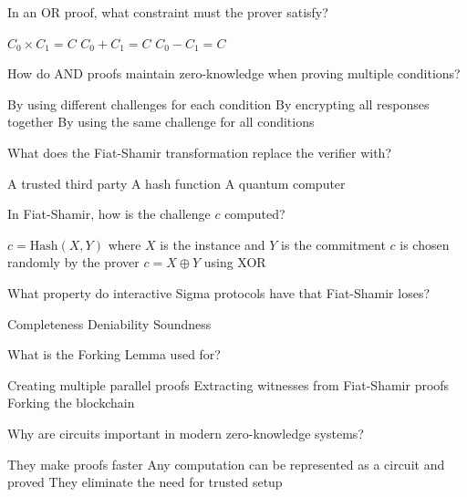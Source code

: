\documentclass[10pt,a4paper,american]{exam}
\begin{document}
\begin{questions}
	\question In an OR proof, what constraint must the prover satisfy?
	\begin{randomizechoices}
		\choice $C_0 \times C_1 = C$
		\CorrectChoice $C_0 + C_1 = C$
		\choice $C_0 - C_1 = C$
	\end{randomizechoices}

	\question How do AND proofs maintain zero-knowledge when proving multiple conditions?
	\begin{randomizechoices}
		\choice By using different challenges for each condition
		\choice By encrypting all responses together
		\CorrectChoice By using the same challenge for all conditions
	\end{randomizechoices}

	\question What does the Fiat-Shamir transformation replace the verifier with?
	\begin{randomizechoices}
		\choice A trusted third party
		\CorrectChoice A hash function
		\choice A quantum computer
	\end{randomizechoices}

	\question In Fiat-Shamir, how is the challenge $c$ computed?
	\begin{randomizechoices}
		\CorrectChoice $c = \text{Hash}(X, Y)$ where $X$ is the instance and $Y$ is the commitment
		\choice $c$ is chosen randomly by the prover
		\choice $c = X \oplus Y$ using XOR
	\end{randomizechoices}

	\question What property do interactive Sigma protocols have that Fiat-Shamir loses?
	\begin{randomizechoices}
		\choice Completeness
		\CorrectChoice Deniability
		\choice Soundness
	\end{randomizechoices}

	\question What is the Forking Lemma used for?
	\begin{randomizechoices}
		\choice Creating multiple parallel proofs
		\CorrectChoice Extracting witnesses from Fiat-Shamir proofs
		\choice Forking the blockchain
	\end{randomizechoices}

	\question Why are circuits important in modern zero-knowledge systems?
	\begin{randomizechoices}
		\choice They make proofs faster
		\CorrectChoice Any computation can be represented as a circuit and proved
		\choice They eliminate the need for trusted setup
	\end{randomizechoices}


\end{questions}
\end{document}

